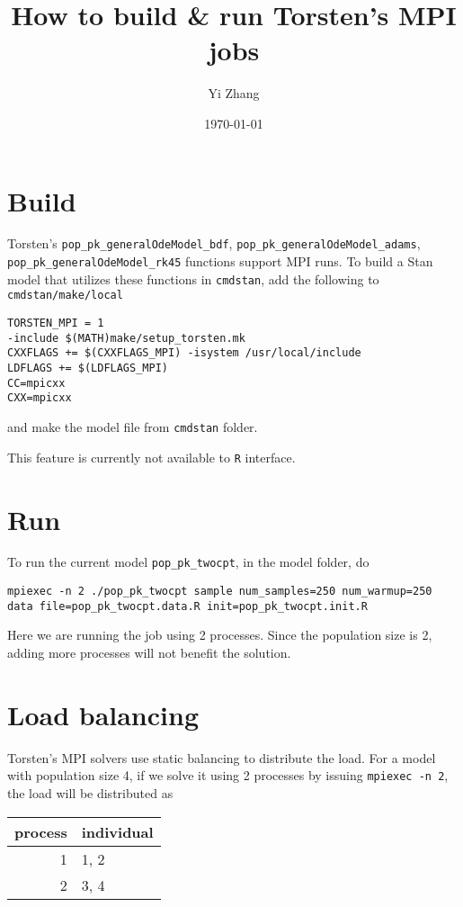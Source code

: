 \documentclass[11pt]{article}
\author{Yi Zhang}
\date{\today}
\title{How to build \& run Torsten's MPI jobs}
\begin{document}
\maketitle

\section{Build}
\label{sec:org4d22419}
Torsten's \texttt{pop\_pk\_generalOdeModel\_bdf}, \texttt{pop\_pk\_generalOdeModel\_adams},
\texttt{pop\_pk\_generalOdeModel\_rk45} functions support MPI
runs. To build a Stan model that utilizes these functions in \texttt{cmdstan},
add the following to \texttt{cmdstan/make/local}
\begin{verbatim}
TORSTEN_MPI = 1
-include $(MATH)make/setup_torsten.mk
CXXFLAGS += $(CXXFLAGS_MPI) -isystem /usr/local/include
LDFLAGS += $(LDFLAGS_MPI)
CC=mpicxx
CXX=mpicxx
\end{verbatim}

and make the model file from \texttt{cmdstan} folder.

This feature is currently not available to \texttt{R} interface.

\section{Run}
\label{sec:orgffbfe0d}
To run the current model \texttt{pop\_pk\_twocpt}, in the model
folder, do
\begin{verbatim}
mpiexec -n 2 ./pop_pk_twocpt sample num_samples=250 num_warmup=250 data file=pop_pk_twocpt.data.R init=pop_pk_twocpt.init.R
\end{verbatim}

Here we are running the job using 2 processes. Since the
population size is 2, adding more processes will not benefit
the solution.

\section{Load balancing}
\label{sec:orgba6d78c}
Torsten's MPI solvers use static balancing to
distribute the load. For a model with population size 4, 
if we solve it using
2 processes by issuing \texttt{mpiexec -n 2},
the load will be
distributed as
\begin{center}
\begin{tabular}{rl}
process & individual\\
\hline
1 & 1, 2\\
2 & 3, 4\\
\end{tabular}
\end{center}
\end{document}
